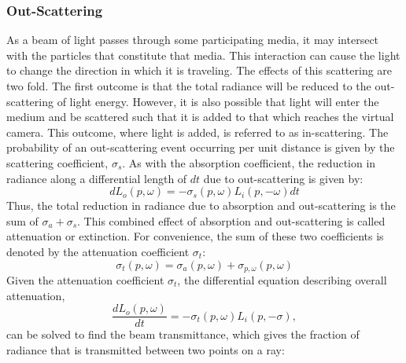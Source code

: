 \documentclass{article}
\begin{document}
\subsubsection{Out-Scattering}

As a beam of light passes through some participating media, it may intersect with the particles that constitute that media. This interaction can cause the light to change the direction in which it is traveling. The effects of this scattering are two fold. The first outcome is that the total radiance will be reduced to the out-scattering of light energy. However, it is also possible that light will enter the medium and be scattered such that it is added to that which reaches the virtual camera. This outcome, where light is added, is referred to as in-scattering.
\newline \newline
The probability of an out-scattering event occurring per unit distance is given by the scattering coefficient, $\sigma_{s}$. As with the absorption coefficient, the reduction in radiance along a differential length of $dt$ due to out-scattering is given by:
\newline \newline
\begin{equation}
dL_{o}(p,\omega) = -\sigma_{s}(p,\omega)L_{i}(p,-\omega) dt
\end{equation}
\newline
Thus, the total reduction in radiance due to absorption and out-scattering is the sum of $\sigma_{a} + \sigma_{s}$. This combined effect of absorption and out-scattering is called attenuation or extinction. For convenience, the sum of these two coefficients is denoted by the attenuation coefficient $\sigma_{t}$:
\newline \newline
\begin{equation}
\sigma_{t}(p,\omega) = \sigma_{a}(p,\omega) + \sigma_{p,\omega}(p,\omega)
\end{equation} 
\newline
Given the attenuation coefficient $\sigma_{t}$, the differential equation describing overall attenuation,
\newline \newline
\begin{equation}
\frac{dL_{o}(p,\omega)}{dt} = -\sigma_{t}(p,\omega)L_{i}(p,-\sigma),
\end{equation}
\newline
can be solved to find the beam transmittance, which gives the fraction of radiance that is transmitted between two points on a ray:
\end{document}
